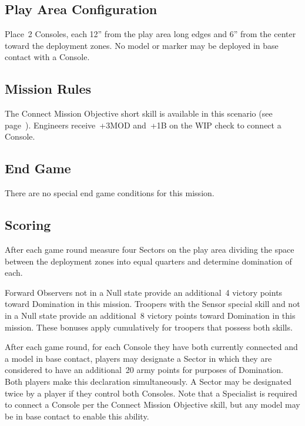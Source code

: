 \label{mission:sweepandclear}

\subsection{Play Area Configuration}

Place~2 Consoles, each 12'' from the play area long edges and 6'' from
the center toward the deployment zones.  No model or marker may be
deployed in base contact with a Console.

\subsection{Mission Rules}

The Connect Mission Objective short skill is available in this
scenario (see page~\pageref{sec:hack-objective}).  Engineers
receive~+3MOD and~+1B on the WIP check to connect a Console.

\subsection{End Game}

There are no special end game conditions for this mission.

\subsection{Scoring}


  After each game round measure four
Sectors on the play area dividing the space between the deployment
zones into equal quarters and determine domination of each.

 Forward Observers not in a Null state
provide an additional~4 victory points toward Domination in this
mission.  Troopers with the Sensor special skill and not in a Null
state provide an additional~8 victory points toward Domination in this
mission. These bonuses apply cumulatively for troopers that possess
both skills.

  After each game round, for each
Console they have both currently connected and a model in base
contact, players may designate a Sector in which they are considered
to have an additional~20 army points for purposes of Domination.  Both
players make this declaration simultaneously.  A Sector may be
designated twice by a player if they control both Consoles.  Note that
a Specialist is required to connect a Console per the Connect Mission
Objective skill, but any model may be in base contact to enable this
ability.

